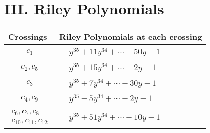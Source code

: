 \documentclass[1p]{elsarticle_modified}
\theoremstyle{definition}
\begin{document}
\centering \section*{ III. Riley Polynomials}
\begin{tabular}{m{50pt}|m{274pt}}
Crossings & \hspace{64pt}Riley Polynomials at each crossing \\
\hline $$\begin{aligned}c_{1}\end{aligned}$$&$\begin{aligned}
&y^{35}+11 y^{34}+\cdots+50 y-1
\end{aligned}$\\
\hline $$\begin{aligned}c_{2},c_{5}\end{aligned}$$&$\begin{aligned}
&y^{35}+15 y^{34}+\cdots+2 y-1
\end{aligned}$\\
\hline $$\begin{aligned}c_{3}\end{aligned}$$&$\begin{aligned}
&y^{35}+7 y^{34}+\cdots-30 y-1
\end{aligned}$\\
\hline $$\begin{aligned}c_{4},c_{9}\end{aligned}$$&$\begin{aligned}
&y^{35}-5 y^{34}+\cdots+2 y-1
\end{aligned}$\\
\hline $$\begin{aligned}c_{6},c_{7},c_{8}\\c_{10},c_{11},c_{12}\end{aligned}$$&$\begin{aligned}
&y^{35}+51 y^{34}+\cdots+10 y-1
\end{aligned}$\\
\hline
\end{tabular}
\vskip 2pc
\end{document}
